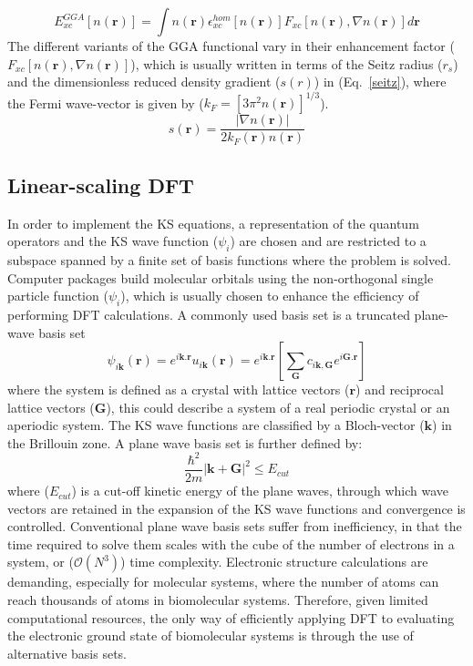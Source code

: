 %
\begin{equation}
E_{xc}^{GGA} [n(\mathbf{r})] = \int n(\mathbf{r}) \epsilon_{xc}^{hom} [n(\mathbf{r})] F_{xc}[n(\mathbf{r}), \nabla n(\mathbf{r})] d \mathbf{r}
\end{equation}
%
The different variants of the GGA functional vary in their enhancement factor ($F_{xc}[n(\mathbf{r}), \nabla n(\mathbf{r})]$), which is usually written in terms of the Seitz radius ($r_s$) and the dimensionless reduced density gradient ($s(r)$) in (Eq.~\ref{seitz}), where the Fermi wave-vector is given by ($k_F=[3 \pi^2 n(\mathbf{r})]^{1/3}$). 
%
\begin{equation} \label{seitz}
s(\mathbf{r}) = \frac{| \nabla n(\mathbf{r})|}{2 k_F(\mathbf{r}) n(\mathbf{r})}
\end{equation}
%
\subsection{Linear-scaling DFT} \label{sec:linear_scaling}
%
In order to implement the KS equations, a representation of the quantum operators and the KS wave function ($\psi_i$) are chosen and are restricted to a subspace spanned by a finite set of basis functions where the problem is solved. Computer packages build molecular orbitals using the non-orthogonal single particle function ($\psi_i$), which is usually chosen to enhance the efficiency of performing DFT calculations.  A commonly used basis set is a truncated plane-wave basis set
%
\begin{equation} \label{pw}
\psi_{i \mathbf{k}} (\mathbf{r}) = e^{i \mathbf{k . r}} u_{i \mathbf{k}} (\mathbf{r}) = e^{i \mathbf{k . r}} \left[ \sum_{\mathbf{G}} c_{i\mathbf{k,G}}e^{i \mathbf{G . r}} \right]
\end{equation}
%
where the system is defined as a crystal with lattice vectors ($\mathbf{r}$) and reciprocal lattice vectors ($\mathbf{G}$), this could describe a system of a real periodic crystal or an aperiodic system. The KS wave functions are classified by a Bloch-vector ($\mathbf{k}$) in the Brillouin zone. A plane wave basis set is further defined by:
%
\begin{equation}
\frac{\hbar^2}{2m} | \mathbf{k} + \mathbf{G} |^2 \leq E_{cut}
\end{equation}
%
where ($E_{cut}$) is a cut-off kinetic energy of the plane waves, through which wave vectors are retained in the expansion of the KS wave functions and convergence is controlled. Conventional plane wave basis sets suffer from inefficiency, in that the time required to solve them scales with the cube of the number of electrons in a system, or ($\mathcal{O}(N^3)$) time complexity. Electronic structure calculations are demanding, especially for molecular systems, where the number of atoms can reach thousands of atoms in biomolecular systems. Therefore, given limited computational resources, the only way of efficiently applying DFT to evaluating the electronic ground state of biomolecular systems is through the use of alternative basis sets. 

